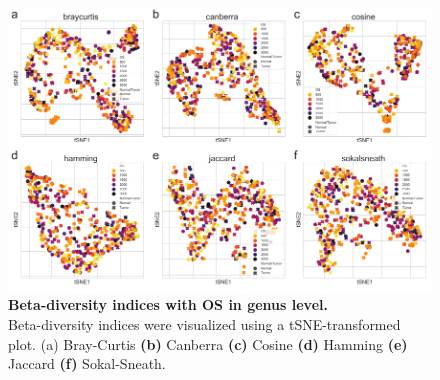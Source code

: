 \documentclass[11pt, a4paper, onecolumn, oneside]{report}
\begin{document}
            \begin{figure}[p]
                \centering
                \includegraphics[width=\linewidth]{Figures/CRC/Figure_07.pdf}
                \caption[Beta-diversity indices with recurrence in genus level]{\textbf{Beta-diversity indices with OS in genus level.}\\
                    Beta-diversity indices were visualized using a tSNE-transformed plot. {(a)} Bray-Curtis \textbf{(b)} Canberra \textbf{(c)} Cosine \textbf{(d)} Hamming \textbf{(e)} Jaccard \textbf{(f)} Sokal-Sneath.}
                \label{fig:CRC-beta-OS}
            \end{figure}
            \clearpage
\end{document}
